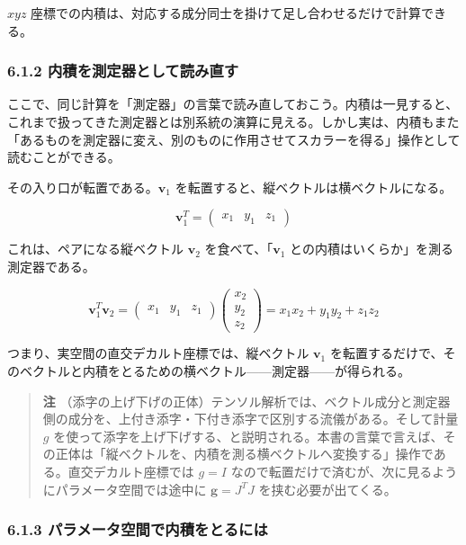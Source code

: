 \documentclass[a4paper,12pt,openany]{book}
\begin{document}
\(xyz\)
座標での内積は、対応する成分同士を掛けて足し合わせるだけで計算できる。

\hypertarget{ux5185ux7a4dux3092ux6e2cux5b9aux5668ux3068ux3057ux3066ux8aadux307fux76f4ux3059}{%
\subsubsection{6.1.2
内積を測定器として読み直す}\label{ux5185ux7a4dux3092ux6e2cux5b9aux5668ux3068ux3057ux3066ux8aadux307fux76f4ux3059}}

ここで、同じ計算を「測定器」の言葉で読み直しておこう。内積は一見すると、これまで扱ってきた測定器とは別系統の演算に見える。しかし実は、内積もまた「あるものを測定器に変え、別のものに作用させてスカラーを得る」操作として読むことができる。

その入り口が転置である。\(\mathbf{v}_1\)
を転置すると、縦ベクトルは横ベクトルになる。

\[\mathbf{v}_1^T = \begin{pmatrix} x_1 & y_1 & z_1 \end{pmatrix}\]

これは、ペアになる縦ベクトル \(\mathbf{v}_2\)
を食べて、「\(\mathbf{v}_1\) との内積はいくらか」を測る測定器である。

\[\mathbf{v}_1^T\mathbf{v}_2
= \begin{pmatrix} x_1 & y_1 & z_1 \end{pmatrix}
\begin{pmatrix} x_2 \\ y_2 \\ z_2 \end{pmatrix}
= x_1x_2 + y_1y_2 + z_1z_2\]

つまり、実空間の直交デカルト座標では、縦ベクトル \(\mathbf{v}_1\)
を転置するだけで、そのベクトルと内積をとるための横ベクトル——測定器——が得られる。

\begin{quote}
\textbf{注}
（添字の上げ下げの正体）テンソル解析では、ベクトル成分と測定器側の成分を、上付き添字・下付き添字で区別する流儀がある。そして計量
\(g\)
を使って添字を上げ下げする、と説明される。本書の言葉で言えば、その正体は「縦ベクトルを、内積を測る横ベクトルへ変換する」操作である。直交デカルト座標では
\(g=I\) なので転置だけで済むが、次に見るようにパラメータ空間では途中に
\(\mathbf{g}=J^T J\) を挟む必要が出てくる。
\end{quote}

\hypertarget{ux30d1ux30e9ux30e1ux30fcux30bfux7a7aux9593ux3067ux5185ux7a4dux3092ux3068ux308bux306bux306f}{%
\subsubsection{6.1.3
パラメータ空間で内積をとるには}\label{ux30d1ux30e9ux30e1ux30fcux30bfux7a7aux9593ux3067ux5185ux7a4dux3092ux3068ux308bux306bux306f}}
\end{document}
